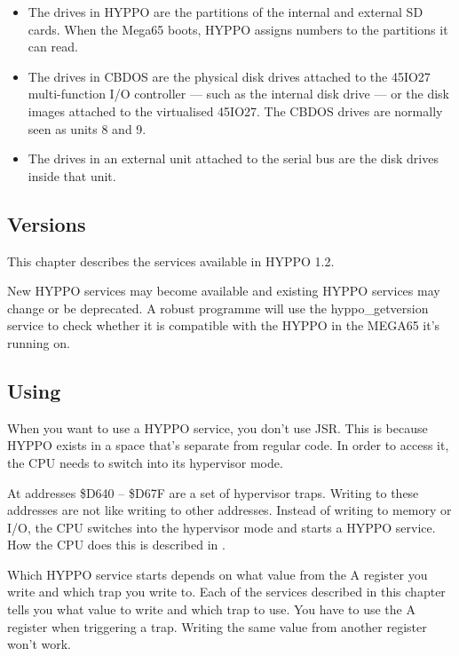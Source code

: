\begin{itemize}
  \item The drives in HYPPO are the partitions of the internal and external SD
        cards. When the Mega65 boots, HYPPO assigns numbers to the partitions
        it can read.
  \item The drives in CBDOS are the physical disk drives attached to the 45IO27
        multi-function I/O controller --- such as the internal disk drive ---
        or the disk images attached to the virtualised 45IO27. The CBDOS drives
        are normally seen as units 8 and 9.
  \item The drives in an external unit attached to the serial bus are the
        disk drives inside that unit.
\end{itemize}

\subsection{Versions}

This chapter describes the services available in HYPPO 1.2.

New HYPPO services may become available and existing HYPPO services may change
or be deprecated. A robust programme will use the hyppo\_getversion service to
check whether it is compatible with the HYPPO in the MEGA65 it's running on.


\subsection{Using}
When you want to use a HYPPO service, you don't use JSR. This is because
HYPPO exists in a space that's separate from regular code. In order to
access it, the CPU needs to switch into its hypervisor mode.

At addresses \$D640 -- \$D67F are a set of hypervisor traps. Writing to these
addresses are not like writing to other addresses. Instead of writing to memory
or I/O, the CPU switches into the hypervisor mode and starts a HYPPO service.
How the CPU does this is described in .

Which HYPPO service starts depends on what value from the A register you
write and which trap you write to. Each of the services described in this
chapter tells you what value to write and which trap to use. You have to use the
A register when triggering a trap. Writing the same value from another register
won't work.

